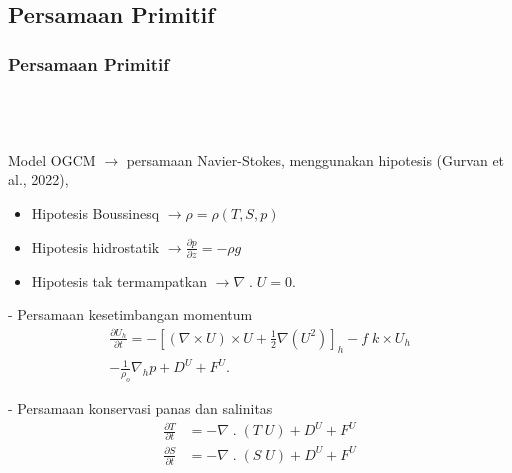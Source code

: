 \documentclass{beamer}
\begin{document}
\subsection{Persamaan Primitif}
\begin{frame}[allowframebreaks]
	\frametitle{Persamaan Primitif}
	$\;$ \\
	$\;$ \\
	$\;$ \\
	Model OGCM $\rightarrow$ persamaan Navier-Stokes, menggunakan hipotesis (Gurvan et al., 2022),
	\begin{itemize}
		\item {\small Hipotesis Boussinesq $\rightarrow \rho = \rho(T,S,p)$}
		\item {\small Hipotesis hidrostatik $\rightarrow \frac{\partial p}{\partial z} = -\rho g$}
		\item {\small Hipotesis tak termampatkan $\rightarrow \nabla \;.\; U = 0$}.
	\end{itemize}
	\newpage
		- Persamaan kesetimbangan momentum
	\begin{equation}
		\begin{aligned}
			\frac{\partial U_h}{\partial t} = - \left[(\nabla \times U) \times U + \frac{1}{2}\nabla (U^2)\right]_h - f \; k \times U_h \\
			- \frac{1}{\rho_o}\nabla_h p + D^U + F^U.
		\end{aligned}
	\end{equation}

	- Persamaan konservasi panas dan salinitas
	\begin{equation}
		\begin{aligned}
			\frac{\partial T}{\partial t} &= - \nabla \; . \; (T\;U)  + D^U + F^U \\
			\frac{\partial S}{\partial t} &= - \nabla \; . \; (S\;U)  + D^U + F^U
		\end{aligned}
	\end{equation}
\end{frame}
\end{document}
